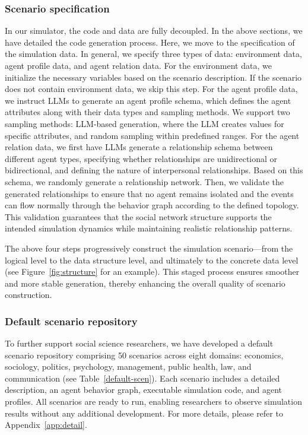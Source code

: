 \documentclass{article}
\theoremstyle{definition}
\theoremstyle{theorem}
\theoremstyle{proof}
\theoremstyle{remark}
\begin{document}
    \subsubsection{Scenario specification}
    In our simulator, the code and data are fully decoupled. 
    In the above sections, we have detailed the code generation process. Here, we move to the specification of the simulation data. 
    In general, we specify three types of data: 
    environment data, agent profile data, and agent relation data.
    For the environment data, we initialize the necessary variables based on the scenario description. If the scenario does not contain environment data, we skip this step.
    For the agent profile data, we instruct LLMs to generate an agent profile schema, which defines the agent attributes along with their data types and sampling methods. We support two sampling methods: LLM-based generation, where the LLM creates values for specific attributes, and random sampling within predefined ranges.
    For the agent relation data, we first have LLMs generate a relationship schema between different agent types, specifying whether relationships are unidirectional or bidirectional, and defining the nature of interpersonal relationships. Based on this schema, we randomly generate a relationship network. Then, we validate the generated relationships to ensure that no agent remains isolated and the events can flow normally through the behavior graph according to the defined topology. This validation guarantees that the social network structure supports the intended simulation dynamics while maintaining realistic relationship patterns.
    
    The above four steps progressively construct the simulation scenario—from the logical level to the data structure level, and ultimately to the concrete data level ({see Figure~\ref{fig:structure} for an example}). This staged process ensures smoother and more stable generation, thereby enhancing the overall quality of scenario construction.
    
    \subsubsection{Default scenario repository}
    To further support social science researchers, we have developed a default scenario repository comprising 50 scenarios across eight domains: economics, sociology, politics, psychology, management, public health, law, and communication (see Table~\ref{default-scen}). Each scenario includes a detailed description, an agent behavior graph, executable simulation code, and agent profiles. All scenarios are ready to run, enabling researchers to observe simulation results without any additional development. For more details, please refer to Appendix~\ref{app:detail}.
\end{document}
